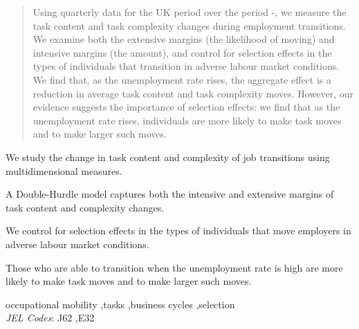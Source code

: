 \documentclass[12pt,authoryear]{elsarticle}
\begin{document}
\begin{frontmatter}
\begin{abstract}
Using quarterly data for the UK period over the period \hspace{-1mm}-\hspace{-1.5mm}, we measure the task content and task complexity changes during employment transitions. We examine both the extensive margins (the likelihood of moving) and  intensive margins (the amount), and control for selection effects in the types of individuals that transition in adverse labour market conditions. We find that, as the unemployment rate rises, the aggregate effect is a reduction in average task content and task complexity moves. However, our evidence suggests the importance of selection effects: we find that as the unemployment rate rises, individuals are more likely to make task moves and to make larger such moves.
		\end{abstract}
		

		\begin{highlights}
			\item We study the change in task content and complexity of job transitions using multidimensional measures.
			\item A Double-Hurdle model captures both the intensive and extensive margins of task content and complexity changes.
			\item We control for selection effects in the types of individuals that move employers in adverse labour market conditions.
			\item Those who are able to transition when the unemployment rate is high are more likely to make task moves and to make larger such moves.
		\end{highlights}

		
		\begin{keyword}
			occupational mobility  \sep tasks  \sep business cycles \sep selection \\
			\textit{JEL Codes}: J62 \sep E32
		\end{keyword}
		
		
		
	\end{frontmatter}
	
\end{document}
